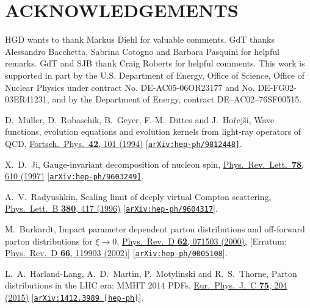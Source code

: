 \documentclass[aps,prl,reprint,groupedaddress, preprintnumbers]{revtex4-1}
\begin{document}
\section{ACKNOWLEDGEMENTS}


HGD wants to thank Markus Diehl for valuable comments. GdT thanks Alessandro Bacchetta, Sabrina Cotogno and Barbara Pasquini for helpful remarks.  GdT and SJB thank Craig Roberts for helpful comments. This work is supported in part by the U.S. Department of Energy, Office of Science, Office of Nuclear Physics under contract No. DE-AC05-06OR23177 and No. DE-FG02-03ER41231, and by the Department of Energy, contract DE--AC02--76SF00515.  





\begin{thebibliography}{50}

  D.~M\"uller, D.~Robaschik, B.~Geyer, F.-M.~Dittes and J.~Ho\v{r}ej\v{s}i,
  Wave functions, evolution equations and evolution kernels from light-ray operators of QCD,
  \href{https://doi.org/10.1002/prop.2190420202}{Fortsch.\ Phys.\  {\bf 42}, 101 (1994)}
  [\href{https://arxiv.org/abs/hep-ph/9812448}{\tt arXiv:hep-ph/9812448]}.


  X.~D.~Ji,
  Gauge-invariant decomposition of nucleon spin,
  \href{https://doi.org/10.1103/PhysRevLett.78.610}{Phys.\ Rev.\ Lett.\  {\bf 78}, 610 (1997)}
  [\href{https://arxiv.org/abs/hep-ph/9603249}{\tt arXiv:hep-ph/9603249]}.

  
  A.~V.~Radyushkin,
  Scaling limit of deeply virtual Compton scattering,
  \href{https://doi.org/10.1016/0370-2693(96)00528-X}{Phys.\ Lett.\ B {\bf 380}, 417 (1996)}
  [\href{https://arxiv.org/abs/hep-ph/9604317}{\tt arXiv:hep-ph/9604317}].
 

  M.~Burkardt,
  Impact parameter dependent parton distributions and off-forward parton distributions for $\xi \to 0$,
  \href{https://doi.org/10.1103/PhysRevD.62.071503}{Phys.\ Rev.\ D {\bf 62}, 071503 (2000)},
  [Erratum: \href{https://doi.org/10.1103/PhysRevD.66.119903}{Phys.\ Rev.\ D {\bf 66}, 119903 (2002)}]
  [\href{https://arxiv.org/abs/hep-ph/0005108}{\tt arXiv:hep-ph/0005108}].
  
  
  L.~A.~Harland-Lang, A.~D.~Martin, P.~Motylinski and R.~S.~Thorne,
  Parton distributions in the LHC era: MMHT 2014 PDFs,
  \href{https://doi.org/10.1140/epjc/s10052-015-3397-6}{Eur.\ Phys.\ J.\ C {\bf 75}, 204 (2015)}
  [\href{https://arxiv.org/abs/1412.3989}{\tt arXiv:1412.3989 [hep-ph]}].
  

\end{thebibliography}
\end{document}
